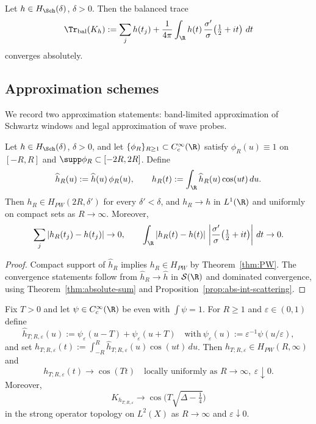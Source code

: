 \begin{corollary}
\label{cor:balanced-trace-finite}
Let $h\in H_{\Sch}(\delta)$, $\delta>0$. Then the balanced trace
\[
  \Tr_{\mathrm{bal}}(K_h)
  := \sum_j h(t_j) + \frac{1}{4\pi}\int_{\R} h(t)\,\frac{\sigma'}{\sigma}\!\left(\tfrac12+it\right)\,dt
\]
converges absolutely.
\end{corollary}

\subsection{Approximation schemes}
\label{subsec:approximation-schemes}

We record two approximation statements: band-limited approximation of Schwartz windows and legal approximation of wave probes.

\begin{proposition}
\label{prop:PW-approx-Schwartz}
Let $h\in H_{\Sch}(\delta)$, $\delta>0$, and let $\{\phi_R\}_{R\ge1}\subset C_c^\infty(\R)$ satisfy $\phi_R(u)\equiv 1$ on $[-R,R]$ and $\supp\phi_R\subset[-2R,2R]$. Define
\[
  \widehat h_R(u):=\widehat h(u)\,\phi_R(u),\qquad
  h_R(t):=\int_{\R}\widehat h_R(u)\cos(ut)\,du.
\]
Then $h_R\in H_{PW}(2R,\delta')$ for every $\delta'<\delta$, and $h_R\to h$ in $L^1(\R)$ and uniformly on compact sets as $R\to\infty$. Moreover,
\[
  \sum_j |h_R(t_j)-h(t_j)| \to 0,\qquad
  \int_{\R} |h_R(t)-h(t)|\,\left|\frac{\sigma'}{\sigma}\!\left(\tfrac12+it\right)\right|\,dt \to 0.
\]
\end{proposition}

\begin{proof}
Compact support of $\widehat h_R$ implies $h_R\in H_{PW}$ by Theorem~\ref{thm:PW}. The convergence statements follow from $\widehat h_R\to \widehat h$ in $\mathcal S(\R)$ and dominated convergence, using Theorem~\ref{thm:absolute-sum} and Proposition~\ref{prop:abs-int-scattering}.
\end{proof}

\begin{proposition}
\label{prop:wave-approx}
Fix $T>0$ and let $\psi\in C_c^\infty(\R)$ be even with $\int\psi=1$. For $R\ge1$ and $\varepsilon\in(0,1)$ define
\[
  \widehat h_{T;R,\varepsilon}(u):=\psi_\varepsilon(u-T)+\psi_\varepsilon(u+T) \quad \text{with}\ \psi_\varepsilon(u):=\varepsilon^{-1}\psi(u/\varepsilon),
\]
and set $h_{T;R,\varepsilon}(t):=\int_{-R}^{R}\widehat h_{T;R,\varepsilon}(u)\cos(ut)\,du$. Then $h_{T;R,\varepsilon}\in H_{PW}(R,\infty)$ and
\[
  h_{T;R,\varepsilon}(t)\to \cos(Tt)\quad \text{locally uniformly as } R\to\infty,\ \varepsilon\downarrow0.
\]
Moreover,
\[
  K_{h_{T;R,\varepsilon}} \to \cos\!\Big(T\sqrt{\Delta-\tfrac14}\Big)
\]
in the strong operator topology on $L^2(X)$ as $R\to\infty$ and $\varepsilon\downarrow0$.
\end{proposition}

